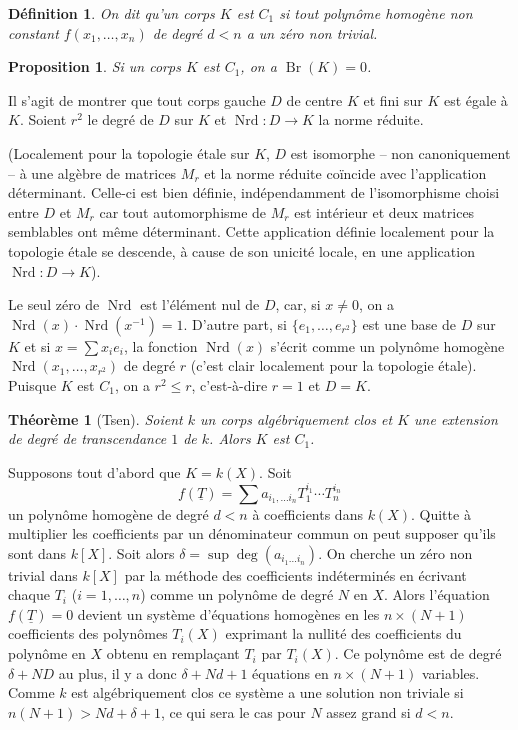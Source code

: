 \documentclass{article}
\DeclareMathOperator{\br}{Br}
\DeclareMathOperator{\nrd}{Nrd}
\newtheorem{proposition}[subsubsection]{Proposition}
\newtheorem{definition}[subsubsection]{Définition}
\newtheorem{theorem}[subsubsection]{Théorème}
\begin{document}
\begin{definition}\label{3-2-1}
On dit qu'un corps $K$ est $C_1$ si tout polynôme homogène non constant 
$f(x_1,\dotsc,x_n)$ de degré $d<n$ a un zéro non trivial.
\end{definition}





\begin{proposition}\label{3-2-2}
Si un corps $K$ est $C_1$, on a $\br(K)=0$.
\end{proposition}

Il s'agit de montrer que tout corps gauche $D$ de centre $K$ et fini sur $K$ 
est égale à $K$. Soient $r^2$ le degré de $D$ sur $K$ et $\nrd:D\to K$ la 
norme réduite. 

(Localement pour la topologie étale sur $K$, $D$ est isomorphe -- non 
canoniquement -- à une algèbre de matrices $M_r$ et la norme réduite 
coïncide avec l'application déterminant. Celle-ci est bien définie, 
indépendamment de l'isomorphisme choisi entre $D$ et $M_r$ car tout 
automorphisme de $M_r$ est intérieur et deux matrices semblables ont 
même déterminant. Cette application définie localement pour la 
topologie étale se descende, à cause de son unicité locale, en une 
application $\nrd:D\to K$). 

Le seul zéro de $\nrd$ est l'élément nul de $D$, car, si $x\ne 0$, on a 
$\nrd(x)\cdot \nrd(x^{-1}) = 1$. D'autre part, si $\{e_1,\dotsc,e_{r^2}\}$ est 
une base de $D$ sur $K$ et si $x=\sum x_i e_i$, la fonction $\nrd(x)$ s'écrit 
comme un polynôme homogène $\nrd(x_1,\dotsc,x_{r^2})$ de degré $r$ (c'est 
clair localement pour la topologie étale). Puisque $K$ est $C_1$, on a 
$r^2\leqslant r$, c'est-à-dire $r=1$ et $D=K$. 





\begin{theorem}[Tsen]\label{3-2-3}
Soient $k$ un corps algébriquement clos et $K$ une extension de degré de 
transcendance $1$ de $k$. Alors $K$ est $C_1$.
\end{theorem}

Supposons tout d'abord que $K=k(X)$. Soit 
\[
  f(\underline T) = \sum a_{i_1,\dotsc i_n} T_1^{i_1} \dotsm T_n^{i_n}
\]
un polynôme homogène de degré $d<n$ à coefficients dans $k(X)$. Quitte 
à multiplier les coefficients par un dénominateur commun on peut supposer 
qu'ils sont dans $k[X]$. Soit alors $\delta=\sup\deg(a_{i_1\dotsc i_n})$. On 
cherche un zéro non trivial dans $k[X]$ par la méthode des coefficients 
indéterminés en écrivant chaque $T_i$ ($i=1,\dotsc,n$) comme un 
polynôme de degré $N$ en $X$. Alors l'équation 
$f(\underline T)=0$ devient un système d'équations homogènes en les 
$n\times (N+1)$ coefficients des polynômes $T_i(X)$ exprimant la nullité 
des coefficients du polynôme en $X$ obtenu en remplaçant $T_i$ par 
$T_i(X)$. Ce polynôme est de degré $\delta+N D$ au plus, il y a donc 
$\delta+N d+1$ équations en $n\times (N+1)$ variables. Comme $k$ est 
algébriquement clos ce système a une solution non triviale si 
$n(N+1)>N d+\delta+1$, ce qui sera le cas pour $N$ assez grand si $d<n$. 
\end{document}
